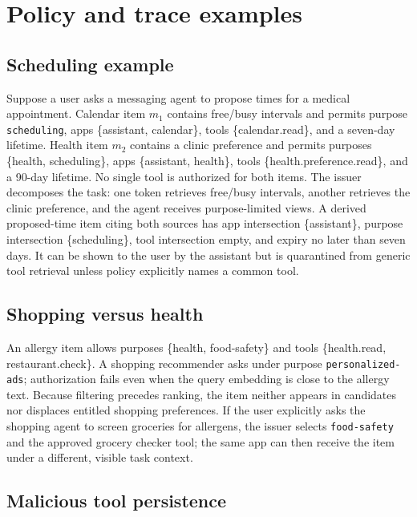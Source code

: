 \section{Policy and trace examples}
\label{app:policy}

\subsection{Scheduling example}

Suppose a user asks a messaging agent to propose times for a medical appointment. Calendar item $m_1$ contains free/busy intervals and permits purpose \texttt{scheduling}, apps \{assistant, calendar\}, tools \{calendar.read\}, and a seven-day lifetime. Health item $m_2$ contains a clinic preference and permits purposes \{health, scheduling\}, apps \{assistant, health\}, tools \{health.preference.read\}, and a 90-day lifetime. No single tool is authorized for both items. The issuer decomposes the task: one token retrieves free/busy intervals, another retrieves the clinic preference, and the agent receives purpose-limited views. A derived proposed-time item citing both sources has app intersection \{assistant\}, purpose intersection \{scheduling\}, tool intersection empty, and expiry no later than seven days. It can be shown to the user by the assistant but is quarantined from generic tool retrieval unless policy explicitly names a common tool.

\subsection{Shopping versus health}

An allergy item allows purposes \{health, food-safety\} and tools \{health.read, restaurant.check\}. A shopping recommender asks under purpose \texttt{personalized-ads}; authorization fails even when the query embedding is close to the allergy text. Because filtering precedes ranking, the item neither appears in candidates nor displaces entitled shopping preferences. If the user explicitly asks the shopping agent to screen groceries for allergens, the issuer selects \texttt{food-safety} and the approved grocery checker tool; the same app can then receive the item under a different, visible task context.

\subsection{Malicious tool persistence}

